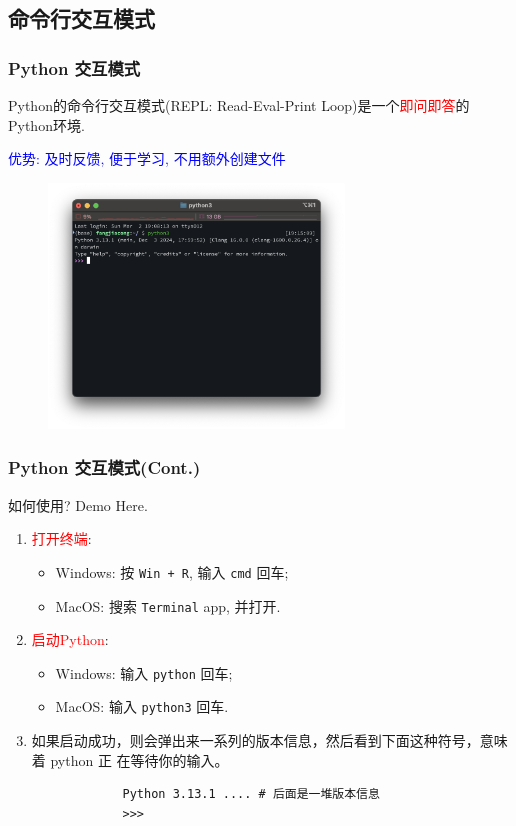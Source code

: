\documentclass{ctexbeamer}
\begin{document}
        \subsection{命令行交互模式}
        \begin{frame}
            \frametitle{Python 交互模式}
            Python的命令行交互模式(REPL: Read-Eval-Print Loop)是一个\textcolor{red}{即问即答}的Python环境. 

            \textcolor{blue}{优势: 及时反馈, 便于学习, 不用额外创建文件}
            \begin{figure}[htpb]
                \centering
                \includegraphics[width=0.7\textwidth]{./images/terminal.png}
            \end{figure}
        \end{frame}

        \begin{frame}[fragile]
            \frametitle{Python 交互模式(Cont.)}
            如何使用? Demo Here.
            \begin{enumerate}
                \item \textcolor{red}{打开终端}:
                \begin{itemize}
                    \item Windows: 按 \texttt{Win + R}, 输入 \texttt{cmd} 回车;
                    \item MacOS: 搜索 \texttt{Terminal} app, 并打开.
                \end{itemize}  
                \item \textcolor{red}{启动Python}: 
                \begin{itemize}
                    \item Windows: 输入 \texttt{python} 回车;
                    \item MacOS: 输入 \texttt{python3} 回车.
                \end{itemize}
                \item 如果启动成功，则会弹出来一系列的版本信息，然后看到下面这种符号，意味着 python 正
                在等待你的输入。
            \end{enumerate}
            \begin{verbatim}
                Python 3.13.1 .... # 后面是一堆版本信息
                >>> 
            \end{verbatim}
        \end{frame}
\end{document}
